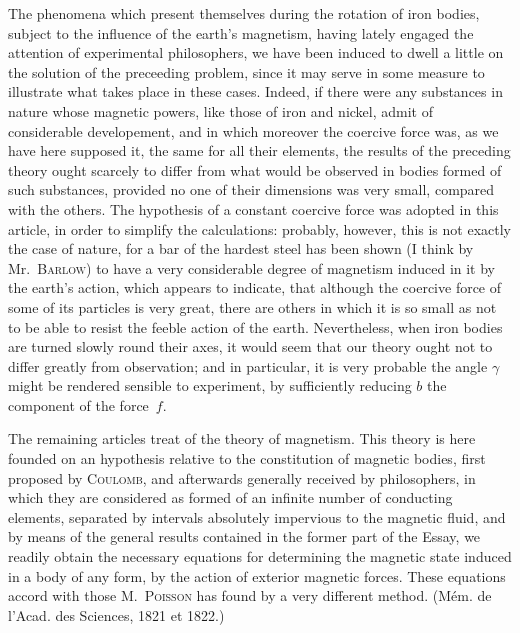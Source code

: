 \documentclass[11pt,notitlepage]{amsart}
\let\Person\textsc
\begin{document}
The phenomena which present themselves during the rotation of iron
bodies, subject to the influence of the earth's magnetism, having lately engaged
the attention of experimental philosophers, we have been induced to dwell a
little on the solution of the preceeding problem, since it may serve in some
measure to illustrate what takes place in these cases. Indeed, if there were
any substances in nature whose magnetic powers, like those of iron and nickel,
admit of considerable developement, and in which moreover the coercive force
was, as we have here supposed it, the same for all their elements, the results
of the preceding theory ought scarcely to differ from what would be observed
in bodies formed of such substances, provided no one of their dimensions was
very small, compared with the others. The hypothesis of a constant coercive
force was adopted in this article, in order to simplify the calculations: 
probably, however, this is not exactly the case of nature,
for a bar of the hardest
steel has been shown (I think by Mr.~\Person{Barlow})
to have a very considerable
degree of magnetism induced in it by the earth's action, which appears to
indicate, that although the coercive force
of some of its particles is very great,
there are others in which it is so small as not to be able to resist the feeble
action of the earth. Nevertheless, when iron bodies are turned slowly round
their axes, it would seem that our theory ought not to differ greatly from
observation;
and in particular, it is very probable the angle $\gamma$ might be rendered
sensible to experiment, by sufficiently reducing $b$
the component of the force~$f$.

The remaining articles treat of the theory of magnetism. This theory
is here founded on an hypothesis relative to the constitution of
magnetic bodies,
first proposed by \Person{Coulomb},
and afterwards generally received by philosophers,
in which they are considered as formed of an infinite number of conducting
elements, separated by intervals absolutely impervious to the magnetic fluid,
and by means of the general results contained in the former part of the Essay,
we readily obtain the necessary equations for determining the magnetic state
induced in a body of any form, by the action of exterior magnetic forces.
These equations accord with those M.~\Person{Poisson}
has found by a very different
method. (M\'em. de l'Acad. des Sciences, 1821 et 1822.)
\end{document}
